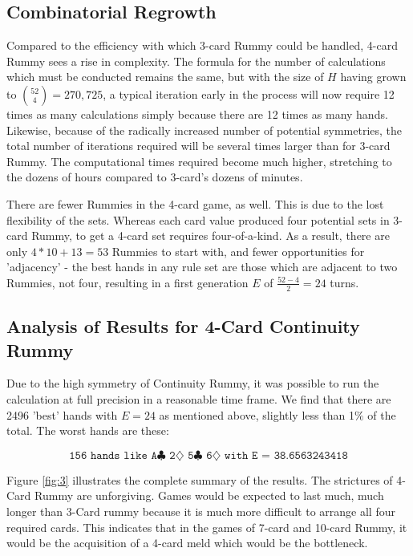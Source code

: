 \documentclass[letter,12pt]{article}
\begin{document}
\subsection{Combinatorial Regrowth}

Compared to the efficiency with which 3-card Rummy could be handled, 4-card Rummy sees a rise in complexity. The formula for the number of calculations which must be conducted remains the same, but with the size of $H$ having grown to $\binom{52}{4} = 270,725$, a typical iteration early in the process will now require 12 times as many calculations simply because there are 12 times as many hands. Likewise, because of the radically increased number of potential symmetries, the total number of iterations required will be several times larger than for 3-card Rummy. The computational times required become much higher, stretching to the dozens of hours compared to 3-card's dozens of minutes.

There are fewer Rummies in the 4-card game, as well. This is due to the lost flexibility of the sets. Whereas each card value produced four potential sets in 3-card Rummy, to get a 4-card set requires four-of-a-kind. As a result, there are only $4*10 + 13 = 53$ Rummies to start with, and fewer opportunities for 'adjacency' - the best hands in any rule set are those which are adjacent to two Rummies, not four, resulting in a first generation $E$ of $\frac{52-4}{2} = 24$ turns.

\subsection{Analysis of Results for 4-Card Continuity Rummy}

Due to the high symmetry of Continuity Rummy, it was possible to run the calculation at full precision in a reasonable time frame. We find that there are 2496 'best' hands with $E=24$ as mentioned above, slightly less than 1$\%$ of the total. The worst hands are these:

$$\texttt{156 hands like A$\clubsuit$ 2$\diamondsuit$ 5$\clubsuit$ 6$\diamondsuit$ with E = 38.6563243418}$$

Figure \ref{fig:3} illustrates the complete summary of the results. The strictures of 4-Card Rummy are unforgiving. Games would be expected to last much, much longer than 3-Card rummy because it is much more difficult to arrange all four required cards. This indicates that in the games of 7-card and 10-card Rummy, it would be the acquisition of a 4-card meld which would be the bottleneck.
\end{document}
